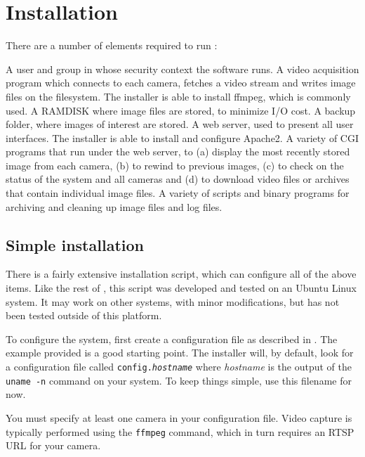 \clearpage
\section{Installation}

  There are a number of elements required to run \PRODUCT{}:

  \BE
  \I A user and group in whose security context the software runs.
  \I A video acquisition program which
     connects to each camera, fetches a video stream and writes
     image files on the filesystem.  The installer
     is able to install ffmpeg, which is commonly used.
  \I A RAMDISK where image files are stored, to minimize I/O cost.
  \I A backup folder, where images of interest are stored.
  \I A web server, used to present all user interfaces.  The installer
     is able to install and configure Apache2.
  \I A variety of CGI programs that run under the web server,
     to (a) display the most recently stored image from each camera,
     (b) to rewind to previous images, (c) to check on the status of
     the system and all cameras and (d) to download video files or
     archives that contain individual image files.
  \I A variety of scripts and binary programs for archiving and cleaning
     up image files and log files.
  \EE

  \subsection{Simple installation}
  \label{simple}

    There is a fairly extensive installation script, which can configure
    all of the above items.  Like the rest of \PRODUCT{}, this script was
    developed and tested on an Ubuntu Linux system.  It may work on other
    systems, with minor modifications, but has not been tested outside
    of this platform.

    To configure the system, first create a configuration file as
    described in .  The example provided is a good starting
    point.  The installer will, by default, look for a configuration file
    called \texttt{config.\emph{hostname}} where \emph{hostname} is the
    output of the \texttt{uname -n} command on your system.  To keep things
    simple, use this filename for now.

    You must specify at least one camera in your configuration file.
    Video capture is typically performed using the \texttt{ffmpeg}
    command, which in turn requires an RTSP URL for your camera.

